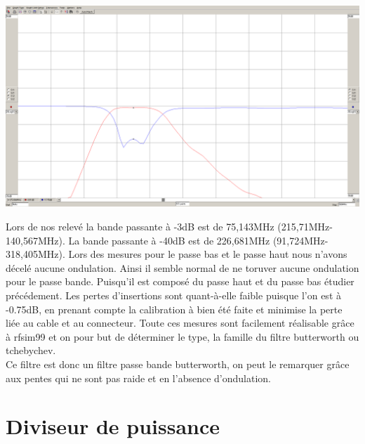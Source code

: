 \documentclass[a4paper,12pt]{report}            %
\begin{document}
\begin{center}\includegraphics[scale = 0.25]{pic/parametre_passe_bande.png}\\ \end{center}
Lors de nos relevé la bande passante à -3dB est de 75,143MHz (215,71MHz-140,567MHz). 
La bande passante à -40dB est de 226,681MHz (91,724MHz-318,405MHz). Lors des mesures pour
le passe bas et le passe haut nous n'avons décelé aucune ondulation. Ainsi il semble normal 
de ne toruver aucune ondulation pour le passe bande. Puisqu'il est composé du passe haut et
du passe bas étudier précédement.
Les pertes d'insertions sont quant-à-elle faible puisque l'on est à -0.75dB, en prenant compte
la calibration à bien été faite et minimise la perte liée au cable et au connecteur.
Toute ces mesures sont facilement réalisable grâce à rfsim99 et on pour but de déterminer
le type, la famille du filtre butterworth ou tchebychev.\\
Ce filtre est donc un filtre passe bande butterworth, on peut le remarquer grâce aux pentes 
qui ne sont pas raide et en l'absence d'ondulation. 


\chapter{Diviseur de puissance}
\end{document}
